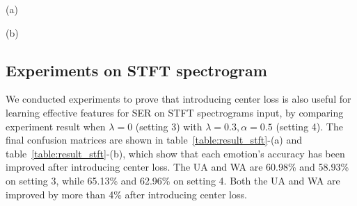 \documentclass{article}
\begin{document}
\begin{table} [!htp]
	\caption{confusion matrix on, (a) setting 3, (b) setting 4}
	\label{table:result_stft}
	\begin{minipage}[b]{.48\linewidth}
		
		\centerline{
			}
				\centerline{\small(a) }\medskip
	\end{minipage}
			\hfill
	\begin{minipage}[b]{0.48\linewidth}
				\centerline{
					}
						\centerline{\small(b)}\medskip
	\end{minipage}
	\vspace{-10pt}
\end{table}				
				
\subsection{Experiments on STFT spectrogram}
We conducted experiments to prove that introducing center loss is also useful for learning effective features for SER on STFT spectrograms input, by comparing experiment result when $\lambda=0$ ({setting 3}) with $\lambda=0.3, \alpha=0.5$ ({setting 4}). The final confusion matrices are shown in table~\ref{table:result_stft}-(a) and table~\ref{table:result_stft}-(b), which show that each emotion's accuracy has been improved after introducing center loss. The UA and WA are 60.98\% and 58.93\% on setting 3, while 65.13\% and 62.96\% on setting 4. Both the UA and WA are improved by more than 4\% after introducing center loss.
\end{document}
